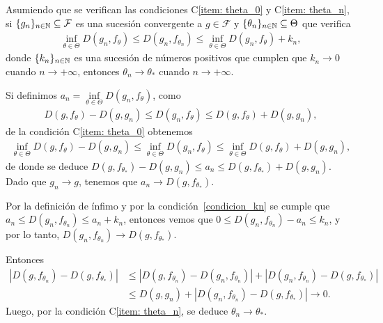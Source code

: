 \begin{proposition}
	Asumiendo que se verifican las condiciones C\ref{item: theta_0} y C\ref{item: theta_n}, si $\{g_{n}\}_{n\in\mathbb{N}} \subseteq \mathcal{F}$ es una sucesión convergente a $g \in \mathcal{F}$ y 
	$\{\theta_{n}\}_{n\in\mathbb{N}} \subseteq \Theta$ que verifica
	\begin{align}
	\label{condicion_kn}
	\inf_{\theta\in\Theta} D(g_{n},f_{\theta}) \le D(g_{n},f_{\theta_n}) \le \inf_{\theta\in\Theta} D(g_{n},f_{\theta}) + k_{n},
	\end{align}
	donde $\{k_{n}\}_{n\in\mathbb{N}}$ es una sucesión de números positivos que cumplen que $k_{n} \to 0$ cuando $n \to +\infty$, entonces $\theta_{n} \to \theta_{*}$ cuando $n \to +\infty$.
\end{proposition}
\begin{dem}
	Si definimos $a_{n} = \inf\limits_{\theta\in\Theta} D(g_{n},f_{\theta})$, 
	como %
	\begin{align*}
	D(g,f_{\theta}) - D(g, g_{n}) \le D(g_{n},f_{\theta}) \le D(g,f_{\theta}) + D(g, g_{n}),
	\end{align*}
	de la condición C\ref{item: theta_0} obtenemos 
	\begin{align*}
	\inf_{\theta\in\Theta} D(g,f_{\theta}) - D(g, g_{n}) \le \inf_{\theta\in\Theta} D(g_{n},f_{\theta}) 
	\le \inf_{\theta\in\Theta} D(g,f_{\theta}) + D(g, g_{n}),
	\end{align*}
	de donde se deduce
	$D(g,f_{\theta_{*}}) - D(g, g_{n}) \le a_{n} \le D(g,f_{\theta_{*}}) + D(g, g_{n})$.
	Dado que $g_{n} \to g$, tenemos que $a_{n} \to D(g,f_{\theta_{*}})$.
	
	Por la definición de ínfimo y por la condición~\ref{condicion_kn} se cumple que $a_{n} \le D(g_{n},f_{\theta_{n}}) \le a_{n} + k_{n}$,
	entonces vemos que $0 \le D(g_{n},f_{\theta_{n}}) - a_{n} \le k_{n}$, y por lo tanto,
	$D(g_{n},f_{\theta_{n}}) \to D(g,f_{\theta_{*}})$.
	
	Entonces 
	\begin{align*}
	|D(g,f_{\theta_{n}}) - D(g,f_{\theta_{*}})| & \le |D(g,f_{\theta_{n}}) - D(g_{n},f_{\theta_{n}})|
	+ |D(g_{n},f_{\theta_{n}}) - D(g,f_{\theta_{*}})| \\
	& \le D(g, g_{n}) + |D(g_{n},f_{\theta_{n}}) - D(g,f_{\theta_{*}})| \to 0.
	\end{align*}
	Luego, por la condición C\ref{item: theta_n}, se deduce $\theta_{n} \to \theta_{*}$.
\end{dem}

